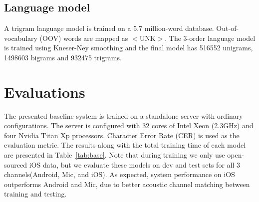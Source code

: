 \documentclass[a4paper]{article}
\begin{document}

\subsection{Language model}

A trigram language model is trained on a 5.7 million-word database. Out-of-vocabulary (OOV) words are mapped as $<$UNK$>$. The 3-order language model is trained using Kneser-Ney smoothing and the final model has 516552 unigrams, 1498603 bigrams and 932475 trigrams.

\section{Evaluations}

The presented baseline system is trained on a standalone server with ordinary
configurations. The server is configured with 32 cores of Intel Xeon (2.3GHz) and four
Nvidia Titan Xp processors. Character Error Rate (CER) is used as the evaluation metric. 
The results along with the total training time of each model are presented in Table~\ref{tab:base}. 
Note that during training we only use open-sourced iOS data, but we evaluate
these models on dev and test sets for all 3 channels(Android, Mic, and iOS). As
expected, system performance on iOS outperforms Android and Mic, due to better
acoustic channel matching between training and testing.
\end{document}
